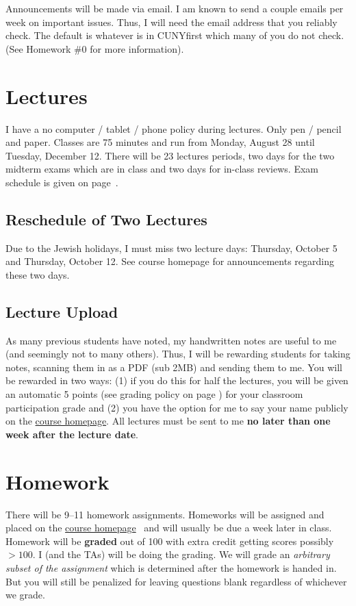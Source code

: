 \documentclass[12pt]{article}
\newcommand{\coursewebpage}{\href{https://github.com/kapelner/QC_Math_241_Fall_2017}{course homepage}}
\begin{document}
Announcements will be made via email. I am known to send a couple emails per week on important issues. Thus, I will need the email address that you reliably check. The default is whatever is in CUNYfirst which many of you do not check. (See Homework \#0 for more information).

\section*{Lectures}

I have a no computer / tablet / phone policy during lectures. Only pen / pencil and paper. Classes are 75 minutes and run from Monday, August 28 until Tuesday, December 12. There will be 23 lectures periods, two days for the two midterm exams which are in class and two days for in-class reviews. Exam schedule is given on page~\pageref{subsec:exam_schedule}.

\subsection*{Reschedule of Two Lectures}

Due to the Jewish holidays, I must miss two lecture days: Thursday, October 5 and Thursday, October 12. See course homepage for announcements regarding these two days.

\subsection*{Lecture Upload}

As many previous students have noted, my handwritten notes are useful to me (and seemingly not to many others). Thus, I will be rewarding students for taking notes, scanning them in as a PDF (sub 2MB) and sending them to me. You will be rewarded in two ways: (1) if you do this for half the lectures, you will be given an automatic 5 points (see grading policy on page \pageref{sec:grading}) for your classroom participation grade and (2) you have the option for me to say your name publicly on the \coursewebpage. All lectures must be sent to me \textbf{no later than one week after the lecture date}.

\section*{Homework}

There will be 9--11 homework assignments. Homeworks will be assigned and placed on the \coursewebpage~ and will usually be due a week later in class. Homework will be \textbf{graded} out of 100 with extra credit getting scores possibly $> 100$. I (and the TAs) will be doing the grading. We will grade an \textit{arbitrary subset of the assignment} which is determined after the homework is handed in. But you will still be penalized for leaving questions blank regardless of whichever we grade. 
\end{document}
